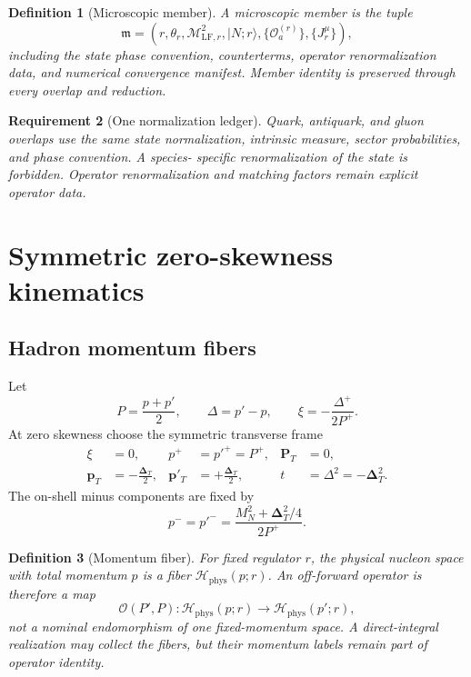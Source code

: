 \documentclass[11pt]{article}
\newtheorem{definition}{Definition}[section]
\newtheorem{requirement}[definition]{Requirement}
\newcommand{\DT}{\bm{\Delta}_{T}}
\newcommand{\Hil}{\mathcal H}
\newcommand{\LF}{\mathrm{LF}}
\newcommand{\cO}{\mathcal O}
\newcommand{\cM}{\mathcal M}
\begin{document}
\begin{definition}[Microscopic member]
\label{def:microscopic-member}
A microscopic member is the tuple
\begin{equation}
 \mathfrak m=
 \left(r,\theta_r,\cM^2_{\LF,r},
 |N;r\rangle,\{\cO_a^{(r)}\},\{J_r^\mu\}\right),
\label{eq:microscopic-member}
\end{equation}
including the state phase convention, counterterms, operator
renormalization data, and numerical convergence manifest.  Member identity
is preserved through every overlap and reduction.
\end{definition}

\begin{requirement}[One normalization ledger]
\label{req:one-normalization}
Quark, antiquark, and gluon overlaps use the same state normalization,
intrinsic measure, sector probabilities, and phase convention.  A species-
specific renormalization of the state is forbidden.  Operator
renormalization and matching factors remain explicit operator data.
\end{requirement}

\section{Symmetric zero-skewness kinematics}
\label{sec:kinematics}

\subsection{Hadron momentum fibers}

Let
\begin{equation}
 P=\frac{p+p'}{2},
 \qquad
 \Delta=p'-p,
 \qquad
 \xi=-\frac{\Delta^+}{2P^+}.
\label{eq:average-transfer}
\end{equation}
At zero skewness choose the symmetric transverse frame
\begin{align}
 \xi&=0,
 &p^+&=p'^+=P^+,
 &\bm P_T&=0,
\label{eq:symmetric-frame-1}\\
 \bm p_T&=-\frac{\DT}{2},
 &\bm p'_T&=+\frac{\DT}{2},
 &t&=\Delta^2=-\DT^2.
\label{eq:symmetric-frame-2}
\end{align}
The on-shell minus components are fixed by
\begin{equation}
 p^- = p'^-=
\frac{M_N^2+\DT^2/4}{2P^+}.
\label{eq:on-shell-minus}
\end{equation}

\begin{definition}[Momentum fiber]
\label{def:momentum-fiber}
For fixed regulator \(r\), the physical nucleon space with total momentum
\(p\) is a fiber \(\Hil_{\mathrm{phys}}(p;r)\).  An off-forward operator is therefore a
map
\begin{equation}
 \cO(P',P):\Hil_{\mathrm{phys}}(p;r)\longrightarrow\Hil_{\mathrm{phys}}(p';r),
\label{eq:operator-fiber-map}
\end{equation}
not a nominal endomorphism of one fixed-momentum space.  A direct-integral
realization may collect the fibers, but their momentum labels remain part of
operator identity.
\end{definition}
\end{document}
